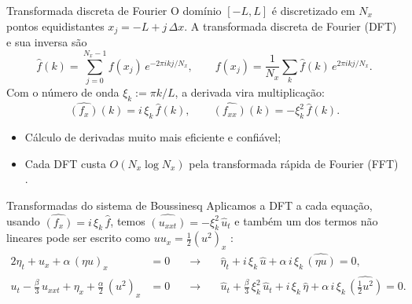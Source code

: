 \begin{frame}{Transformada discreta de Fourier}
  O domínio $[-L,L]$ é discretizado em $N_x$ pontos equidistantes $x_j = -L + j\,\Delta x$. A transformada discreta de Fourier (DFT) e sua
  inversa são \parencite{trefethen2000}
  \begin{equation*}
    \hat{f}(k) = \sum_{j=0}^{N_x-1} f(x_j)\, e^{-2\pi i k j / N_x},
    \qquad
    f(x_j) = \frac{1}{N_x} \sum_{k} \hat{f}(k)\, e^{2\pi i k j / N_x}.
  \end{equation*}
  Com o número de onda $\xi_k := \pi k / L$, a derivada vira multiplicação:
  \begin{equation*}
    \widehat{(f_x)}(k) = i\,\xi_k\,\hat{f}(k),
    \qquad
    \widehat{(f_{xx})}(k) = -\xi_k^2\,\hat{f}(k).
  \end{equation*}
  \begin{itemize}[<+->]
    \item Cálculo de derivadas muito mais eficiente e confiável;
    \item Cada DFT custa $O(N_x \log N_x)$ pela transformada rápida de Fourier (FFT)
          \parencite{cooley1965}.
  \end{itemize}
\end{frame}

\begin{frame}{Transformadas do sistema de Boussinesq}
  Aplicamos a DFT a cada equação, usando $\widehat{(f_x)} = i\,\xi_k\,\hat{f}$, temos
  $\widehat{(u_{xxt})} = -\xi_k^2\,\hat{u}_t$ e também um dos termos não lineares pode ser escrito como $u u_x = \tfrac{1}{2}(u^2)_x$ \parencite{martins2023}:
  \begin{alignat*}{2}
    \eta_t + u_x + \alpha\,(\eta u)_x &= 0
      &\quad\longrightarrow\quad&
    \hat{\eta}_t + i\,\xi_k\,\hat{u} + \alpha\,i\,\xi_k\,\widehat{(\eta u)} = 0, \\[6pt]
    u_t - \tfrac{\beta}{3}\,u_{xxt} + \eta_x + \tfrac{\alpha}{2}\,(u^2)_x &= 0
      &\quad\longrightarrow\quad&
    \hat{u}_t + \tfrac{\beta}{3}\,\xi_k^2\,\hat{u}_t + i\,\xi_k\,\hat{\eta}
      + \alpha\,i\,\xi_k\,\widehat{\left(\tfrac{1}{2}u^2\right)} = 0.
  \end{alignat*}
\end{frame}

